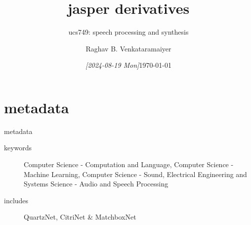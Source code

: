 \documentclass[aspectratio=169,xcolor={dvipsnames,svgnames}]{beamer}
\date{\textit{[2024-08-19 Mon]}}
\title{jasper derivatives}
\subtitle{ucs749: speech processing and synthesis}
\author{%
\normalsize Raghav B. Venkataramaiyer
}
\institute{%
CSED TIET Patiala India.
}
\date{\scriptsize \today}
\begin{document}
\maketitle

\section{metadata}
\label{sec:org00cb09d}

\begin{frame}[label={sec:org7321081}]{metadata}
\begin{description}
\item[{keywords}] Computer Science - Computation and
Language, Computer Science - Machine Learning,
Computer Science - Sound, Electrical Engineering and
Systems Science - Audio and Speech Processing
\item[{includes}] QuartzNet, CitriNet \& MatchboxNet
\end{description}
\end{frame}
\end{document}
